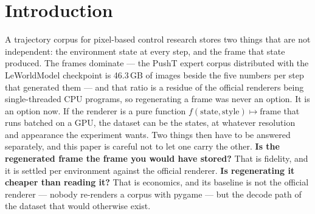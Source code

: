 \documentclass{article}
\begin{document}
\begin{abstract}
Storage holds everywhere: summed over the registry the state that determines a
frame is \textbf{\seStorageRatio$\times$} smaller than the raw pixels it
produces and \seJpegRatio$\times$ smaller than their JPEGs. \textbf{Speed is
per family and, against the fastest decoder, a wash --- we say so.} Against
eight CPU workers \seNfamAbove{} of \seNfamRated{} families win, by up to
\seStoredMax$\times$, and \seNfamBelow{} do not; against nvJPEG on the GPU the
median environment is \seGpuMedian$\times$ and the geometric mean
\seGpuGeomean$\times$. A faster decoder does not remove the frames from disk,
so it moves the speed column and leaves the storage and configuration claims
untouched. On fidelity, classic
control agrees on \textbf{100.00000\%} of pixels (0 of 250.9\,M), the
tile-atlas families at maximum absolute difference \textbf{0}, and the analytic
ray-cast families on \textbf{100\% of interior pixels}, with every lower floor
declared and its mechanism named. Downstream, a pretrained PushT world model
with its own evaluation unmodified and only the pixels swapped scores 88.0\%
against 87.7\% (McNemar $p = 1.000$), while that evaluation detects blank
frames at $p < 0.001$. Four fidelity findings generalise beyond this
repository: Triton's default \texttt{fp32} lowering is not bit-identical to
torch and three flags close it; a CUDA graph captured outside a rounding
context silently replays a truncating kernel; the interior-pixel parity metric
in common use fails for smooth per-pixel renderers; and
\texttt{mujoco\_warp} makes a frame depend on which \emph{world slot} drew it.
\end{abstract}

\section{Introduction}

A trajectory corpus for pixel-based control research stores two things that are
not independent: the environment state at every step, and the frame that state
produced. The frames dominate --- the PushT expert corpus distributed with the
LeWorldModel checkpoint is 46.3\,GB of images beside the five numbers per step
that generated them --- and that ratio is a residue of the official renderers
being single-threaded CPU programs, so regenerating a frame was never an
option.
It is an option now. If the renderer is a pure function
$f(\mathrm{state}, \mathrm{style}) \mapsto \mathrm{frame}$ that runs batched on
a GPU, the dataset can be the states, at whatever resolution and appearance the
experiment wants. Two things then have to be answered separately, and this
paper is careful not to let one carry the other. \textbf{Is the regenerated
frame the frame you would have stored?} That is fidelity, and it is settled
per environment against the official renderer. \textbf{Is regenerating it
cheaper than reading it?} That is economics, and its baseline is not the
official renderer --- nobody re-renders a corpus with pygame --- but the
decode path of the dataset that would otherwise exist.
\end{document}
